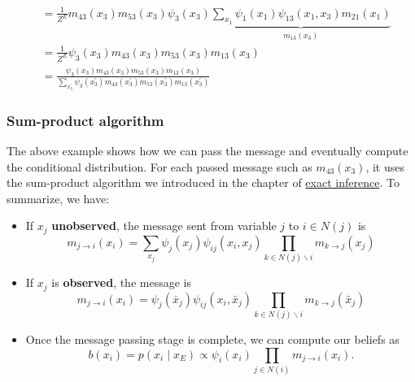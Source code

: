 \begin{example}
\begin{align*}
        &=\frac{1}{Z^E} m_{43}\left(x_3\right) m_{53}\left(x_3\right) \psi_3\left(x_3\right) \underbrace{\sum_{x_1} \psi_1\left(x_1\right) \psi_{13}\left(x_1, x_3\right) m_{21}\left(x_1\right)}_{m_{13}\left(x_3\right)} \\
        &=\frac{1}{Z^E} \psi_3\left(x_3\right) m_{43}\left(x_3\right) m_{53}\left(x_3\right) m_{13}\left(x_3\right)\\
        &=\frac{\psi_3\left(x_3\right) m_{43}\left(x_3\right) m_{53}\left(x_3\right) m_{13}\left(x_3\right)}{\sum_{x_3^{\prime}} \psi_3\left(x_3^{\prime}\right) m_{43}\left(x_3^{\prime}\right) m_{53}\left(x_3^{\prime}\right) m_{13}\left(x_3^{\prime}\right)}
    \end{align*}
\end{example}
\subsubsection*{Sum-product algorithm}
The above example shows how we can pass the message and eventually compute the conditional distribution. For each passed message such as $m_{43}(x_3)$, it uses the sum-product algorithm we introduced in the chapter of \hyperref[sec:sum-product]{exact inference}. To summarize, we have:
\begin{itemize}
    \item If $x_j$ \textbf{unobserved}, the message sent from variable $j$ to $i \in N(j)$ is
    $$
    m_{j \rightarrow i}\left(x_i\right)=\sum_{x_j} \psi_j\left(x_j\right) \psi_{i j}\left(x_i, x_j\right) \prod_{k \in N(j) \backslash i} m_{k \rightarrow j}\left(x_j\right)
    $$
    \item If $x_j$ is \textbf{observed}, the message is
    $$
    m_{j \rightarrow i}\left(x_i\right)=\psi_j\left(\bar{x}_j\right) \psi_{i j}\left(x_i, \bar{x}_j\right) \prod_{k \in N(j) \backslash i} m_{k \rightarrow j}\left(\bar{x}_j\right)
    $$
    \item Once the message passing stage is complete, we can compute our beliefs as
    $$
    b\left(x_i\right)=p\left(x_i \mid x_E\right) \propto \psi_i\left(x_i\right) \prod_{j \in N(i)} m_{j \rightarrow i}\left(x_i\right) .
    $$
\end{itemize}
